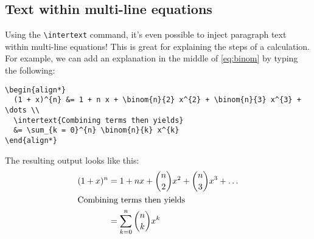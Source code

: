 \documentclass{article}
\newcommand*{\code}[1]{\texttt{#1}}
\begin{document}
\subsection{Text within multi-line equations}
Using the \code{\textbackslash{}intertext} command, it's even possible to inject paragraph text within multi-line equations!
This is great for explaining the steps of a calculation.
For example, we can add an explanation in the middle of \cref{eq:binom} by typing the following:
\begin{verbatim}
\begin{align*}
  (1 + x)^{n} &= 1 + n x + \binom{n}{2} x^{2} + \binom{n}{3} x^{3} + \dots \\
  \intertext{Combining terms then yields}
  &= \sum_{k = 0}^{n} \binom{n}{k} x^{k}
\end{align*}
\end{verbatim}
The resulting output looks like this:
\begin{align*}
  (1 + x)^{n} &= 1 + n x + \binom{n}{2} x^{2} + \binom{n}{3} x^{3} + \dots \\
  \intertext{Combining terms then yields}
  &= \sum_{k = 0}^{n} \binom{n}{k} x^{k}
\end{align*}
\end{document}
